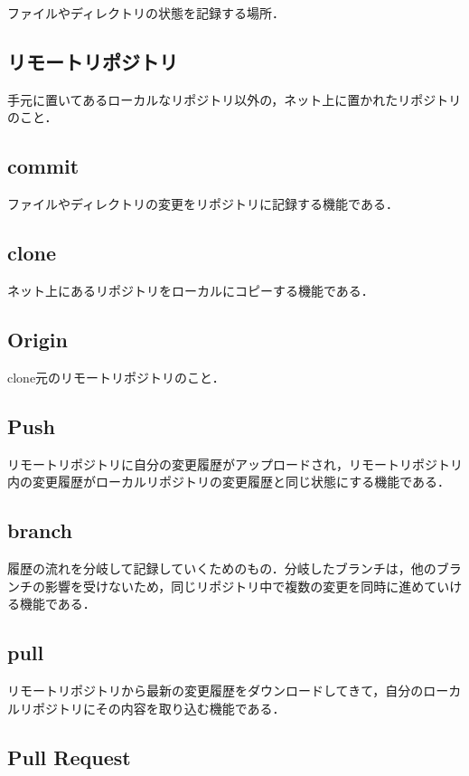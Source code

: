 ファイルやディレクトリの状態を記録する場所．

\subsection{リモートリポジトリ}

手元に置いてあるローカルなリポジトリ以外の，ネット上に置かれたリポジトリのこと．

\subsection{commit}

ファイルやディレクトリの変更をリポジトリに記録する機能である．


\subsection{clone}

ネット上にあるリポジトリをローカルにコピーする機能である．


\subsection{Origin}

clone元のリモートリポジトリのこと．


\subsection{Push}

リモートリポジトリに自分の変更履歴がアップロードされ，リモートリポジトリ内の変更履歴がローカルリポジトリの変更履歴と同じ状態にする機能である．


\subsection{branch}

履歴の流れを分岐して記録していくためのもの．分岐したブランチは，他のブランチの影響を受けないため，同じリポジトリ中で複数の変更を同時に進めていける機能である．


\subsection{pull}

リモートリポジトリから最新の変更履歴をダウンロードしてきて，自分のローカルリポジトリにその内容を取り込む機能である．


\subsection{Pull Request}

